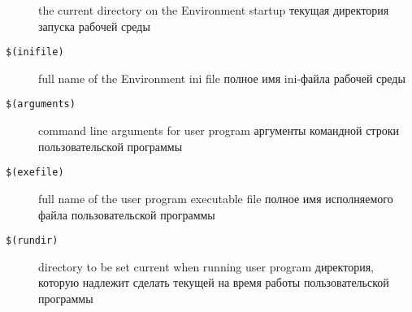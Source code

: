 \begin{description}
 \ifenglish
 the current directory on the Environment startup
 \else
 текущая директория запуска рабочей среды
 \fi
\item[{\tt \$(inifile)}] 
 \ifenglish
 full name of the Environment ini file
 \else
 полное имя ini-файла рабочей среды
 \fi
\item[{\tt \$(arguments)}] 
 \ifenglish
 command line arguments for user program
  \else
 аргументы командной строки пользовательской программы 
 \fi
\item[{\tt \$(exefile)}] 
 \ifenglish
 full name of the user program executable file
 \else
 полное имя исполняемого файла пользовательской программы
 \fi
\item[{\tt \$(rundir)}] 
 \ifenglish
 directory to be set current when running user program
 \else
 директория, которую надлежит сделать текущей на время работы пользовательской
 программы  
 \fi
\end{description}
